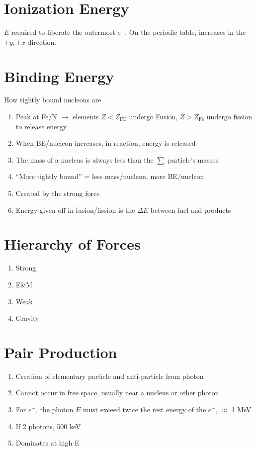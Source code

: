 \documentclass[10pt,letter]{article}
\begin{document}
\section{Ionization Energy} %
\label{sec:ionization_energy}
$E$ required to liberate the outermost $e^-$. On the periodic table, increases in the $+y,+x$ direction.

\section{Binding Energy} %
\label{sec:binding_energy}
How tightly bound nucleons are
\begin{enumerate}
    \item  Peak at Fe/N $\rightarrow$ elements $Z<Z_{\textrm{FE}}$ undergo Fusion, $Z>Z_{\textrm{Fe}} $ undergo fission to release energy
    \item When BE/nucleon increases, in reaction, energy is released
    \item The mass of a nucleus is always less than the $\sum $ particle's masses
    \item ``More tightly bound'' = less mass/nucleon, more BE/nucleon
    \item Created by the strong force
    \item Energy given off in fusion/fission is the $\Delta E$ between fuel and products
\end{enumerate}

\section{Hierarchy of Forces} %
\label{sec:heirarchy_of_forces}
\begin{enumerate}
    \item Strong
    \item E\&M
    \item Weak
    \item Gravity
\end{enumerate}

\section{Pair Production} %
\label{sec:pair_production}
\begin{enumerate}
    \item Creation of elementary particle and anti-particle from photon
    \item Cannot occur in free space, usually near a nucleus or other photon
    \item For $e^-$, the photon $E$ must exceed twice the rest energy of the $e^-$, $\approx $ 1 MeV
    \item If 2 photons, 500 keV
    \item Dominates at high E
\end{enumerate}
\end{document}
